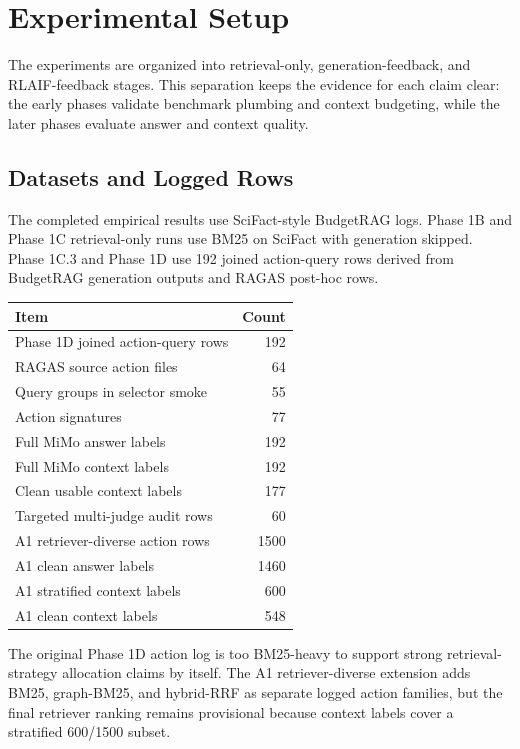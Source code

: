 \section{Experimental Setup}

The experiments are organized into retrieval-only, generation-feedback, and RLAIF-feedback stages. This separation keeps the evidence for each claim clear: the early phases validate benchmark plumbing and context budgeting, while the later phases evaluate answer and context quality.

\subsection{Datasets and Logged Rows}

The completed empirical results use SciFact-style BudgetRAG logs. Phase 1B and Phase 1C retrieval-only runs use BM25 on SciFact with generation skipped. Phase 1C.3 and Phase 1D use 192 joined action-query rows derived from BudgetRAG generation outputs and RAGAS post-hoc rows.

\begin{center}
\begin{tabular}{l r}
\toprule
Item & Count \\
\midrule
Phase 1D joined action-query rows & 192 \\
RAGAS source action files & 64 \\
Query groups in selector smoke & 55 \\
Action signatures & 77 \\
Full MiMo answer labels & 192 \\
Full MiMo context labels & 192 \\
Clean usable context labels & 177 \\
Targeted multi-judge audit rows & 60 \\
A1 retriever-diverse action rows & 1500 \\
A1 clean answer labels & 1460 \\
A1 stratified context labels & 600 \\
A1 clean context labels & 548 \\
\bottomrule
\end{tabular}
\end{center}

The original Phase 1D action log is too BM25-heavy to support strong retrieval-strategy allocation claims by itself. The A1 retriever-diverse extension adds BM25, graph-BM25, and hybrid-RRF as separate logged action families, but the final retriever ranking remains provisional because context labels cover a stratified 600/1500 subset.

